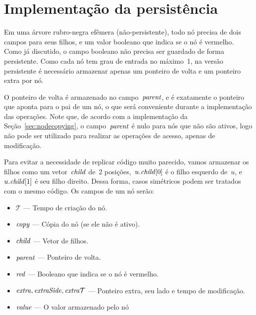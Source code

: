 \documentclass[../../main.tex]{subfiles}
\begin{document}
\section{Implementação da persistência}

\newcommand{\ts}{\mathcal{T}}
\newcommand{\cp}{\V{copy}}
\newcommand{\child}{\V{child}}
\newcommand{\parent}{\V{parent}}
\newcommand{\red}{\V{red}}
\newcommand{\extra}{\V{extra}}
\newcommand{\eSide}{\V{extraSide}}
\newcommand{\eTs}{\V{extra\mathcal{T}}}
\newcommand{\version}{\V{version}}
\newcommand{\side}{\V{side}}
\newcommand{\roots}{\V{roots}}
\newcommand{\val}{\V{value}}
\newcommand{\cur}{\V{current}}


Em uma árvore rubro-negra efêmera (não-persistente), todo nó precisa de dois campos para seus filhos, e um valor booleano que indica se o nó é vermelho. Como já discutido, o campo booleano não precisa ser guardado de forma persistente. Como cada nó tem grau de entrada no máximo~1, na versão persistente é necessário armazenar apenas um ponteiro de volta e um ponteiro extra por nó.

O ponteiro de volta é armazenado no campo~$\parent$, e é exatamente o ponteiro que aponta para o pai de um nó, o que será conveniente durante a implementação das operações. Note que, de acordo com a implementação da Seção~\ref{sec:nodecopying}, o campo~$\parent$ é nulo para nós que não são ativos, logo não pode ser utilizado para realizar as operações de acesso, apenas de modificação.

Para evitar a necessidade de replicar código muito parecido, vamos armazenar os filhos como um vetor~$\child$ de~2 posições,~$u.\child[0]$ é o filho esquerdo de~$u$, e~$u.\child[1]$ é seu filho direito. Dessa forma, casos simétricos podem ser tratados com o mesmo código. Os campos de um nó serão:
\begin{itemize}
\item $\ts$ --- Tempo de criação do nó.
\item $\cp$ --- Cópia do nó (se ele não é ativo).
\item $\child$ --- Vetor de filhos.
\item $\parent$ --- Ponteiro de volta.
\item $\red$ --- Booleano que indica se o nó é vermelho.
\item $\extra, \eSide, \eTs$ --- Ponteiro extra, seu lado e tempo de modificação.
\item $\val$ --- O valor armazenado pelo nó
\end{itemize}
\end{document}

